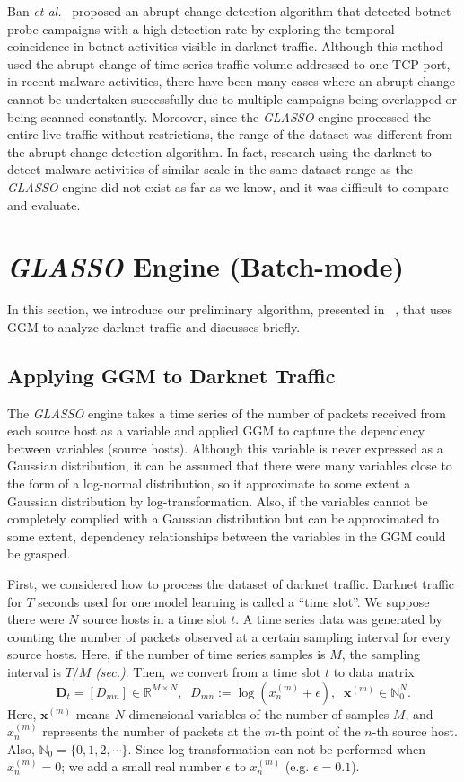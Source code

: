 \documentclass[conference]{IEEEtran}
\begin{document}
Ban {\it et al.}~\cite{Ban} proposed an abrupt-change detection algorithm that detected botnet-probe campaigns with a high detection rate by exploring the temporal coincidence in botnet activities visible in darknet traffic.
Although this method used the abrupt-change of time series traffic volume addressed to one TCP port, in recent malware activities, there have been many cases where an abrupt-change cannot be undertaken successfully due to multiple campaigns being overlapped or being scanned constantly.
Moreover, since the {\it GLASSO} engine processed the entire live traffic without restrictions, the range of the dataset was different from the abrupt-change detection algorithm.
In fact, research using the darknet to detect malware activities of similar scale in the same dataset range as the {\it GLASSO} engine did not exist as far as we know, and it was difficult to compare and evaluate.




\section{{\it GLASSO} Engine (Batch-mode)}
In this section, we introduce our preliminary algorithm, presented in ~\cite{Han}, that uses GGM to analyze darknet traffic and discusses briefly.


\subsection{Applying GGM to Darknet Traffic}
The {\it GLASSO} engine takes a time series of the number of packets received from each source host as a variable and applied GGM to capture the dependency between variables (source hosts).
Although this variable is never expressed as a Gaussian distribution, it can be assumed that there were many variables close to the form of a log-normal distribution, so it approximate to some extent a Gaussian distribution by log-transformation.
Also, if the variables cannot be completely complied with a Gaussian distribution but can be approximated to some extent, dependency relationships between the variables in the GGM could be grasped.

First, we considered how to process the dataset of darknet traffic.
Darknet traffic for $T$ seconds used for one model learning is called a ``time slot''.
We suppose there were $N$ source hosts in a time slot $t$.
A time series data was generated by counting the number of packets observed at a certain sampling interval for every source hosts.
Here, if the number of time series samples is $M$, the sampling interval is $T/M$ {\it (sec.)}.
Then, we convert from a time slot $t$ to data matrix
\begin{equation*}
\bm{D}_t=[D_{mn}]\in\mathbb{R}^{M \times N},
\;\;D_{mn} := \log(x_n^{(m)}+\epsilon),
\;\;\bm{x}^{(m)}\in\mathbb{N}_0^{N}.
\end{equation*}
Here, $\bm{x}^{(m)}$ means $N$-dimensional variables of the number of samples $M$, and $x_n^{(m)}$ represents the number of packets at the $m$-th point of the $n$-th source host.
Also, $\mathbb{N}_0=\{0,1,2,\cdots\}$.
Since log-transformation can not be performed when $x_n^{(m)}=0$; we add a small real number $\epsilon$ to $x_n^{(m)}$ (e.g. $\epsilon=0.1$).
\end{document}
